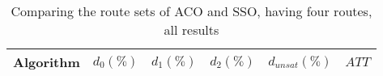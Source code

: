     \begin{table}[H]
    \centering
    \begin{tabular}{|l||l|l|l|l|l|}
    \hline
    Algorithm & $d_0(\%)$ & $d_1(\%)$ & $d_2(\%)$ & $d_{unsat}(\%)$ & $ATT$ \\
    \hline
    \hline
    \hline
    \hline
    \end{tabular}
    \caption {Comparing the route sets of ACO and SSO, having four routes, all results}
    \label{table:performanceComparison_ACOFull}
    \end{table}


